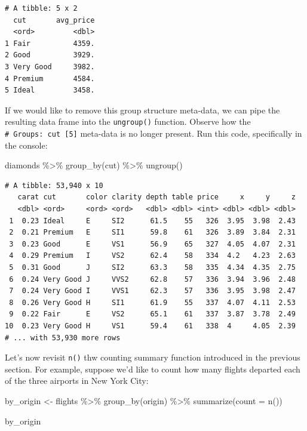 \documentclass[
  letterpaper,
  DIV=11,
  numbers=noendperiod]{scrreprt}
\newenvironment{Shaded}{\begin{snugshade}}{\end{snugshade}}
\newcommand{\AttributeTok}[1]{\textcolor[rgb]{0.40,0.45,0.13}{#1}}
\newcommand{\FunctionTok}[1]{\textcolor[rgb]{0.28,0.35,0.67}{#1}}
\newcommand{\NormalTok}[1]{\textcolor[rgb]{0.00,0.23,0.31}{#1}}
\newcommand{\OtherTok}[1]{\textcolor[rgb]{0.00,0.23,0.31}{#1}}
\newcommand{\SpecialCharTok}[1]{\textcolor[rgb]{0.37,0.37,0.37}{#1}}
\theoremstyle{definition}
\theoremstyle{remark}
\begin{document}
\begin{verbatim}
# A tibble: 5 x 2
  cut       avg_price
  <ord>         <dbl>
1 Fair          4359.
2 Good          3929.
3 Very Good     3982.
4 Premium       4584.
5 Ideal         3458.
\end{verbatim}

If we would like to remove this group structure meta-data, we can pipe
the resulting data frame into the \texttt{ungroup()} function. Observe
how the \texttt{\#\ Groups:\ cut\ {[}5{]}} meta-data is no longer
present. Run this code, specifically in the console:

\begin{Shaded}
\begin{Highlighting}[]
\NormalTok{diamonds }\SpecialCharTok{\%\textgreater{}\%} 
  \FunctionTok{group\_by}\NormalTok{(cut) }\SpecialCharTok{\%\textgreater{}\%} 
  \FunctionTok{ungroup}\NormalTok{()}
\end{Highlighting}
\end{Shaded}

\begin{verbatim}
# A tibble: 53,940 x 10
   carat cut       color clarity depth table price     x     y     z
   <dbl> <ord>     <ord> <ord>   <dbl> <dbl> <int> <dbl> <dbl> <dbl>
 1  0.23 Ideal     E     SI2      61.5    55   326  3.95  3.98  2.43
 2  0.21 Premium   E     SI1      59.8    61   326  3.89  3.84  2.31
 3  0.23 Good      E     VS1      56.9    65   327  4.05  4.07  2.31
 4  0.29 Premium   I     VS2      62.4    58   334  4.2   4.23  2.63
 5  0.31 Good      J     SI2      63.3    58   335  4.34  4.35  2.75
 6  0.24 Very Good J     VVS2     62.8    57   336  3.94  3.96  2.48
 7  0.24 Very Good I     VVS1     62.3    57   336  3.95  3.98  2.47
 8  0.26 Very Good H     SI1      61.9    55   337  4.07  4.11  2.53
 9  0.22 Fair      E     VS2      65.1    61   337  3.87  3.78  2.49
10  0.23 Very Good H     VS1      59.4    61   338  4     4.05  2.39
# ... with 53,930 more rows
\end{verbatim}

Let's now revisit \texttt{n()} thw counting summary function introduced
in the previous section. For example, suppose we'd like to count how
many flights departed each of the three airports in New York City:

\begin{Shaded}
\begin{Highlighting}[]
\NormalTok{by\_origin }\OtherTok{\textless{}{-}}\NormalTok{ flights }\SpecialCharTok{\%\textgreater{}\%} 
  \FunctionTok{group\_by}\NormalTok{(origin) }\SpecialCharTok{\%\textgreater{}\%} 
  \FunctionTok{summarize}\NormalTok{(}\AttributeTok{count =} \FunctionTok{n}\NormalTok{())}

\NormalTok{by\_origin}
\end{Highlighting}
\end{Shaded}
\end{document}
